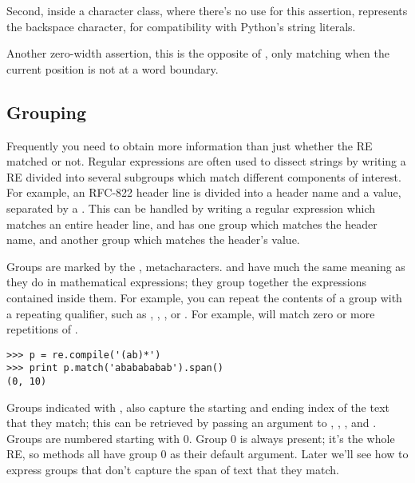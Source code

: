 \documentclass{howto}
\begin{document}
\begin{list}{}{}
Second, inside a character class, where there's no use for this
assertion,  represents the backspace character, for
compatibility with Python's string literals.

\item[\regexp{\e B}] Another zero-width assertion, this is the
opposite of , only matching when the current
position is not at a word boundary.

\end{list}

\subsection{Grouping}

Frequently you need to obtain more information than just whether the
RE matched or not.  Regular expressions are often used to dissect
strings by writing a RE divided into several subgroups which
match different components of interest.  For example, an RFC-822
header line is divided into a header name and a value, separated by a
\character{:}.  This can be handled by writing a regular expression
which matches an entire header line, and has one group which matches the
header name, and another group which matches the header's value.

Groups are marked by the \character{(}, \character{)} metacharacters.
\character{(} and \character{)} have much the same meaning as they do
in mathematical expressions; they group together the expressions
contained inside them. For example, you can repeat the contents of a
group with a repeating qualifier, such as \regexp{*}, \regexp{+},
, or .  For example,
 will match zero or more repetitions of .

\begin{verbatim}
>>> p = re.compile('(ab)*')
>>> print p.match('ababababab').span()
(0, 10)
\end{verbatim}

Groups indicated with \character{(}, \character{)} also capture the
starting and ending index of the text that they match; this can be
retrieved by passing an argument to ,
, , and .  Groups are
numbered starting with 0.  Group 0 is always present; it's the whole
RE, so  methods all have group 0 as their default
argument.  Later we'll see how to express groups that don't capture
the span of text that they match.
\end{document}
